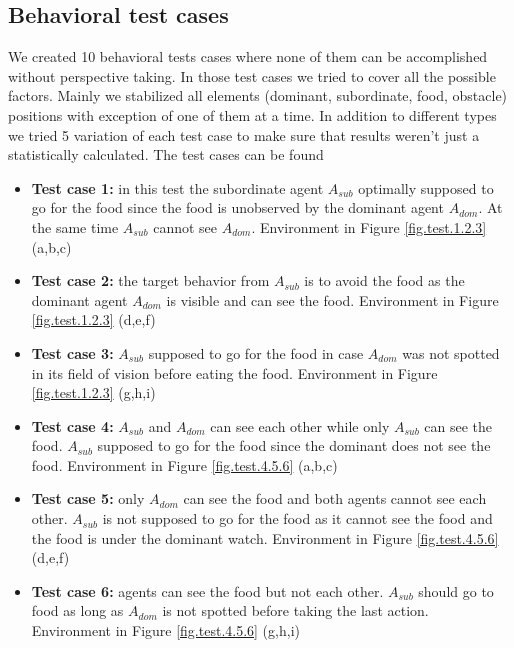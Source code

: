 \documentclass{article}
\begin{document}
\subsection{Behavioral test cases}\label{agents.behavior}
We created 10 behavioral tests cases where none of them can be accomplished without perspective taking. In those test cases we tried to cover all the possible factors. Mainly we stabilized all elements (dominant, subordinate, food, obstacle) positions with exception of one of them at a time.
In addition to different types we tried 5 variation of each test case to make sure that results weren't just a statistically calculated. The test cases can be found 

\begin{itemize}

\item \textbf {Test case 1:} in this test the subordinate agent \(A_{sub}\) optimally supposed to go for the food since the food is unobserved by the dominant agent \(A_{dom}\). At the same time \(A_{sub}\) cannot see \(A_{dom}\). Environment in Figure \ref{fig.test.1.2.3} (a,b,c)

\item \textbf {Test case 2:} the target behavior from \(A_{sub}\) is to avoid the food as the dominant agent \(A_{dom}\) is visible and can see the food. Environment in Figure \ref{fig.test.1.2.3} (d,e,f)

\item \textbf {Test case 3:} \(A_{sub}\) supposed to go for the food in case \(A_{dom}\) was not spotted in its field of vision before eating the food. Environment in Figure \ref{fig.test.1.2.3} (g,h,i)

\item \textbf {Test case 4:} \(A_{sub}\) and \(A_{dom}\) can see each other while only \(A_{sub}\) can see the food. \(A_{sub}\) supposed to go for the food since the dominant does not see the food. Environment in Figure \ref{fig.test.4.5.6} (a,b,c)

\item \textbf {Test case 5:} only \(A_{dom}\) can see the food and both agents cannot see each other. \(A_{sub}\) is not supposed to go for the food as it cannot see the food and the food is under the dominant watch. Environment in Figure \ref{fig.test.4.5.6} (d,e,f)

\item \textbf {Test case 6:} agents can see the food but not each other. \(A_{sub}\) should go to food as long as \(A_{dom}\) is not spotted before taking the last action. Environment in Figure \ref{fig.test.4.5.6} (g,h,i)


\end{itemize}
\end{document}
